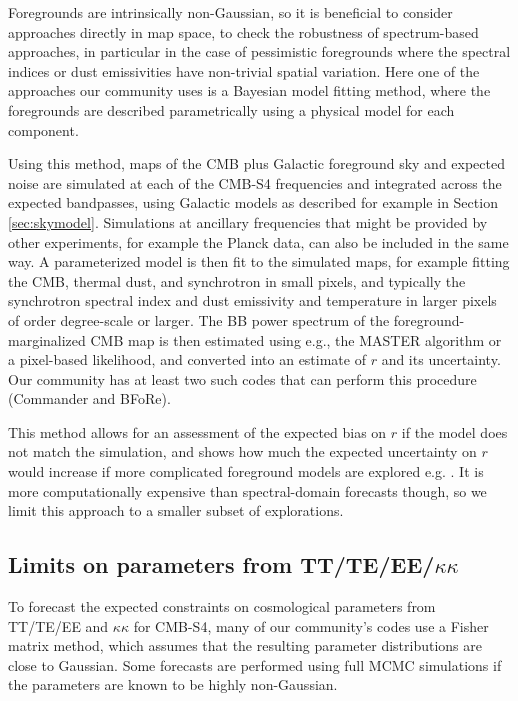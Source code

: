 Foregrounds are intrinsically non-Gaussian, so it is beneficial to consider approaches directly in map space, to check the robustness of spectrum-based approaches, in particular in the case of pessimistic foregrounds where the spectral indices or dust emissivities have non-trivial spatial variation. Here one of the approaches our community uses is a Bayesian model fitting method, where the foregrounds are described parametrically using a physical model for each component.

Using this method, maps of the CMB plus Galactic foreground sky and expected noise are simulated at each of the CMB-S4 frequencies and integrated across the expected bandpasses, using Galactic models as described for example in Section \ref{sec:skymodel}. Simulations at ancillary frequencies that might be provided by other experiments, for example the Planck data, can also be included in the same way. A parameterized model is then fit to the simulated maps, for example fitting the CMB, thermal dust, and synchrotron in small pixels, and typically the synchrotron spectral index and dust emissivity and temperature in larger pixels of order degree-scale or larger. The BB power spectrum of the foreground-marginalized CMB map is then estimated using e.g., the MASTER \cite{hivon02} algorithm or a pixel-based likelihood, and converted into an estimate of $r$ and its uncertainty. Our community has at least two such codes that can perform this procedure (Commander and BFoRe).

This method allows for an assessment of the expected bias on $r$ if the model does not match the simulation, and shows how much the expected uncertainty on $r$ would increase if more complicated foreground models are explored e.g. \cite{armitage-caplan/etal:2011,ramazeilles/etal:2015}. It is more computationally expensive than spectral-domain forecasts though, so we limit this approach to a smaller subset of explorations. 

\subsection{Limits on parameters from TT/TE/EE/$\kappa\kappa$}

To forecast the expected constraints on cosmological parameters from TT/TE/EE and $\kappa\kappa$ for CMB-S4, many of our community's codes use a Fisher matrix method, which assumes that the resulting parameter distributions are close to Gaussian.  Some forecasts are performed using full MCMC simulations if the parameters are known to be highly non-Gaussian. 

